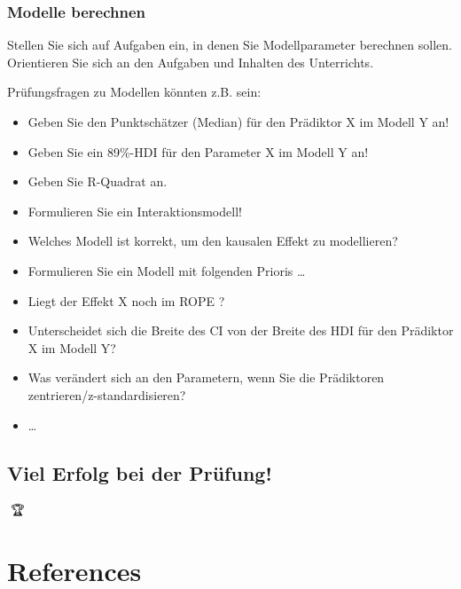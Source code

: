 \documentclass[
  a4paper,
  DIV=11]{scrreprt}
\providecommand{\tightlist}{%
  \setlength{\itemsep}{0pt}\setlength{\parskip}{0pt}}\usepackage{longtable,booktabs,array}
\theoremstyle{definition}
\theoremstyle{remark}
\begin{document}
\hypertarget{modelle-berechnen}{%
\subsection{Modelle berechnen}\label{modelle-berechnen}}

Stellen Sie sich auf Aufgaben ein, in denen Sie Modellparameter
berechnen sollen. Orientieren Sie sich an den Aufgaben und Inhalten des
Unterrichts.

Prüfungsfragen zu Modellen könnten z.B. sein:

\begin{itemize}
\tightlist
\item
  Geben Sie den Punktschätzer (Median) für den Prädiktor X im Modell Y
  an!
\item
  Geben Sie ein 89\%-HDI für den Parameter X im Modell Y an!
\item
  Geben Sie R-Quadrat an.
\item
  Formulieren Sie ein Interaktionsmodell!
\item
  Welches Modell ist korrekt, um den kausalen Effekt zu modellieren?
\item
  Formulieren Sie ein Modell mit folgenden Prioris \ldots{}
\item
  Liegt der Effekt X noch im ROPE ?
\item
  Unterscheidet sich die Breite des CI von der Breite des HDI für den
  Prädiktor X im Modell Y?
\item
  Was verändert sich an den Parametern, wenn Sie die Prädiktoren
  zentrieren/z-standardisieren?
\item
  \ldots{}
\end{itemize}

\hypertarget{viel-erfolg-bei-der-pruxfcfung}{%
\section{Viel Erfolg bei der
Prüfung!}\label{viel-erfolg-bei-der-pruxfcfung}}

🥳🏆


\hypertarget{references}{%
\chapter*{References}\label{references}}
\end{document}
